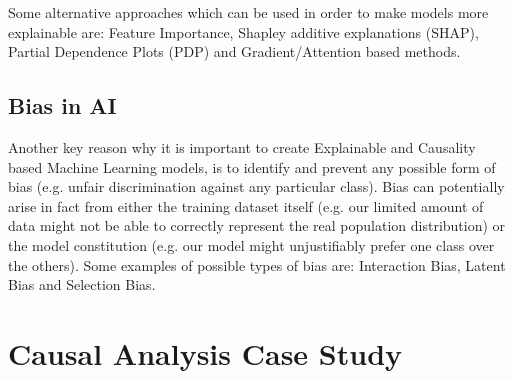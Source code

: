 Some alternative approaches which can be used in order to make models more explainable are: Feature Importance, Shapley additive explanations (SHAP), Partial Dependence Plots (PDP) and Gradient/Attention based methods.

\subsection{Bias in AI}

Another key reason why it is important to create Explainable and Causality based Machine Learning models, is to identify and prevent any possible form of bias (e.g. unfair discrimination against any particular class). Bias can potentially arise in fact from either the training dataset itself (e.g. our limited amount of data might not be able to correctly represent the real population distribution) or the model constitution (e.g. our model might unjustifiably prefer one class over the others). Some examples of possible types of bias are: Interaction Bias, Latent Bias and Selection Bias.

\section{Causal Analysis Case Study}





